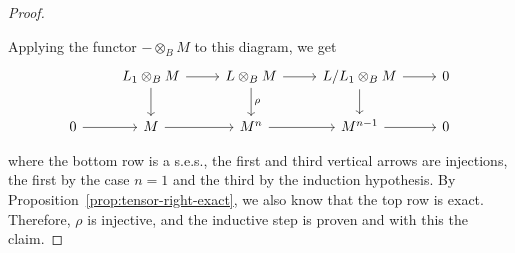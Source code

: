 \begin{proof}
\begin{description}
        Applying the functor $-\otimes_BM$ to this diagram, we get
            $$
            \begin{tikzcd}
                    &L_1\otimes_BM
                        \arrow[r]
                        \arrow[d]
                    &L\otimes_BM
                        \arrow[d,"\rho"]
                        \arrow[r]
                    &L/L_1\otimes_BM
                        \arrow[d]
                        \arrow[r]
                    &0\\
                0
                        \arrow[r]
                    &M
                        \arrow[r]
                    &M^n
                        \arrow[r]
                    &M^{n-1}
                        \arrow[r]
                    &0
            \end{tikzcd}
        $$
    \end{description}
    where the bottom row is a s.e.s., the first and third vertical arrows are injections, the first by the case $n=1$ and the third by the induction hypothesis. By Proposition~\ref{prop:tensor-right-exact}, we also know that the top row is exact. Therefore, $\rho$ is injective, and the inductive step is proven and with this the claim.

\medskip


\end{proof}

